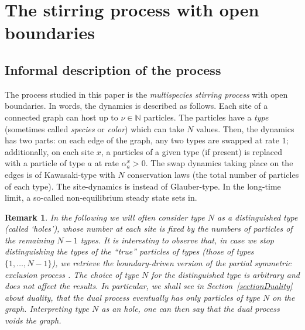 \documentclass[10pt]{article}
\numberwithin{equation}{section}
\numberwithin{equation}{subsection}
\newtheorem{remark}{Remark}
\begin{document}
\section{The stirring process with open boundaries}
\label{sec1}
\subsection{Informal description of the process}
The process studied in this paper is the {\em multispecies stirring process}
with open boundaries. 
In words, the dynamics is described as follows. Each site
of a connected graph can host up to $\nu\in \mathbb{N}$ particles.
The particles have a {\em type} (sometimes called {\em species} or {\em color})
which can take $N$ values.
Then, the dynamics has two parts: on each edge of the graph, 
any two types are swapped at rate $1$; additionally, on each site $x$, 
a particles of a given type (if present) is replaced with a
particle of type $a$ at rate $\alpha_a^x >0$.
The swap dynamics taking place on the edges is of Kawasaki-type 
with $N$ conservation laws
(the total number of particles of each type). 
The site-dynamics is instead of Glauber-type. 
In the long-time limit, a so-called non-equilibrium
steady state sets in.


\noindent
\begin{remark}
\label{hole}
In the following we will often consider type $N$ as a distinguished type
(called `holes'), whose number at each site is fixed by the numbers of particles 
of the remaining $N-1$ types. It is interesting to observe that, in case we stop distinguishing the types of the ``true'' particles of types 
(those of types $\{1,\ldots,N-1\}$), we retrieve the 
boundary-driven version of the partial symmetric exclusion process \cite{schutzSandow,carinci2013duality}.
The choice of type $N$ for the distinguished type is arbitrary and does not affect
the results. In particular, we shall see in Section~\ref{sectionDuality} about duality, that
the dual process eventually has only particles of type $N$ on the graph.
Interpreting type $N$ as an hole, one can then say that the dual process voids the graph.  
\end{remark}
\end{document}
